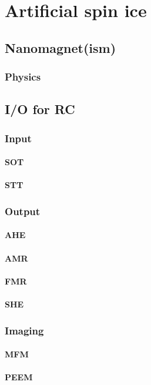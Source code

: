\section{Artificial spin ice}\label{sec:1:ASI} %
\subsection{Nanomagnet(ism)}
\subsubsection{Physics} %
\subsection{I/O for RC}\label{sec:1:ASI_IO}
\subsubsection{Input}
\paragraph{SOT}
\cite{SOT_FM_AFM,SOTswitchingCoPt,SOT_Roadmap,vlasov2022optimal}
\paragraph{STT} %
\subsubsection{Output}
\paragraph{AHE} %
\cite{AHE,AHE_Culcer}
\paragraph{AMR} %
\paragraph{FMR} %
\paragraph{SHE} %
\cite{SHE}
\subsubsection{Imaging} %
\paragraph{MFM} %
\paragraph{PEEM}

